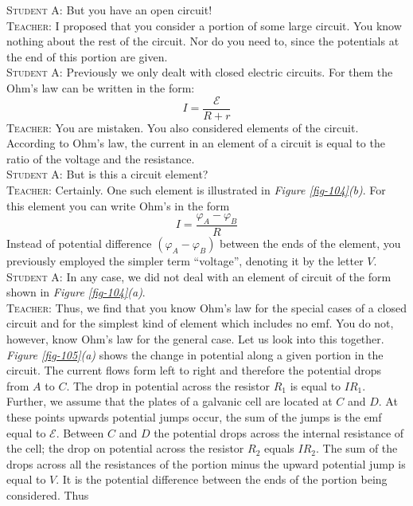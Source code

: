 \documentclass[a4paper,sfsidenotes]{tufte-book}
\newcommand{\Ea}{\mathcal{E}}
\begin{document}
\textsc{Student A:} But you have an open circuit!
\\
\textsc{Teacher:} I proposed that you consider a portion of some large circuit. You know nothing about the rest of the circuit. Nor do you need to, since the potentials at the end of this portion are given.
\\
\textsc{Student A:} Previously we only dealt with closed electric circuits. For them the Ohm's law can be written in the form:
\begin{equation}%
I = \frac{\Ea}{R + r} 
\label{eq-164}
\end{equation}
\textsc{Teacher:} You are mistaken. You also considered elements of the circuit. According to Ohm's law, the current in an element of a circuit is equal to the ratio of the voltage and the resistance.
\\
\textsc{Student A:} But is this a circuit element?
\\
\textsc{Teacher:} Certainly. One such element is illustrated in  \emph{Figure \ref{fig-104}(b)}. For this element you can write Ohm's in the form
\begin{equation}%
I = \frac{\varphi_{A} - \varphi_{B}}{R} 
\label{eq-165}
\end{equation}
Instead of potential difference $(\varphi_{A} - \varphi_{B})$ between the ends of the element, you previously employed the simpler term ``voltage'', denoting it by the letter $V$.
\\
\textsc{Student A:} In any case, we did not deal with an element of circuit of the form shown in \emph{Figure \ref{fig-104}(a)}.
\\
\textsc{Teacher:} Thus, we find that you know Ohm's law for the special cases of a closed circuit and for the simplest kind of element which includes no emf. You do not, however, know Ohm's law for the general case. Let us look into this together.
\\
\emph{Figure \ref{fig-105}(a)} shows the change in potential along a given portion in the circuit. The current flows form left to right and therefore the potential drops from $A$ to $C$. The drop in potential across the resistor $R_{1}$ is equal to $IR_{1}$. Further, we assume that the plates of a galvanic cell are located at $C$ and $D$. At these points upwards potential jumps occur, the sum of the jumps is the emf equal to $\Ea$. Between $C$ and $D$ the potential drops across the internal resistance of the cell; the drop on potential across the resistor $R_{2}$ equals $IR_{2}$. The sum of the drops across all the resistances of the portion minus the upward potential jump is equal to $V$. It is the potential difference between the ends of the portion being considered. Thus
\end{document}
